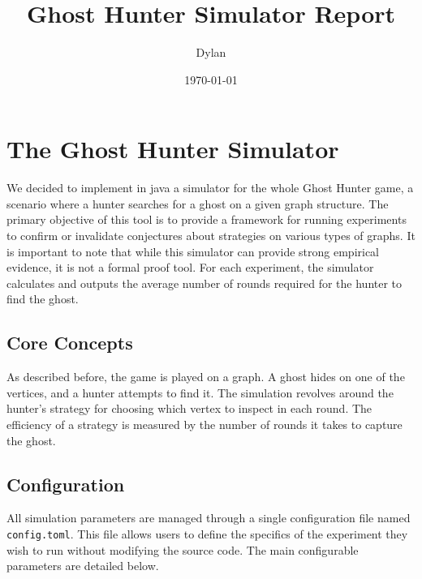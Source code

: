 \documentclass{article}
\title{Ghost Hunter Simulator Report}
\author{Dylan}
\date{\today}
\begin{document}
\maketitle

\section{The Ghost Hunter Simulator}
We decided to implement in java a simulator for the whole Ghost Hunter game, a
scenario where a hunter searches for a ghost on a given graph structure. The
primary objective of this tool is to provide a framework for running
experiments to confirm or invalidate conjectures about strategies on various
types of graphs. It is important to note that while this simulator can provide
strong empirical evidence, it is not a formal proof tool. For each experiment,
the simulator calculates and outputs the average number of rounds required for
the hunter to find the ghost.

\subsection{Core Concepts}
As described before, the game is played on a graph. A ghost hides on one of the 
vertices, and a hunter attempts to find it. The simulation revolves around the
hunter's strategy for choosing which vertex to inspect in each round. The
efficiency of a strategy is measured by the number of rounds it takes to
capture the ghost.

\subsection{Configuration}
All simulation parameters are managed through a single configuration file named 
\texttt{config.toml}. This file allows users to define the specifics of the
experiment they wish to run without modifying the source code. The main
configurable parameters are detailed below.
\end{document}

